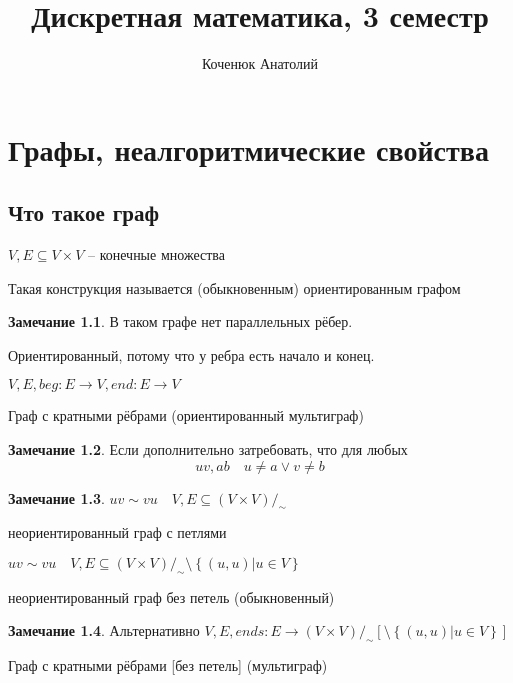 \documentclass{book}
\author{Коченюк Анатолий}
\title{Дискретная математика, 3 семестр}
\theoremstyle{definition}
\newtheorem*{note}{Замечание}
\begin{document}
    \maketitle
    \chapter{Графы, неалгоритмические свойства}
    \section{Что такое граф}

    $V, E\subseteq V\times V$ -- конечные множества

    Такая конструкция называется (обыкновенным) ориентированным графом

    \begin{note}
        В таком графе нет параллельных рёбер. 

    Ориентированный, потому что у ребра есть начало и конец.    \end{note}

    \begin{definition}
        $V, E, beg:E\to V, end:E\to V$

        Граф с кратными рёбрами (ориентированный мультиграф)
    \end{definition}

    \begin{note}
        Если дополнительно затребовать, что для любых \[uv, ab\quad u\neq a \vee v\neq b\]
    \end{note}

    \begin{note}
        $uv\sim vu\quad V, E\subseteq \left( V\times V \right) /_{\sim}$

        неориентированный граф с петлями

        $uv\sim vu\quad V, E\subseteq \left( V\times V \right) /_{\sim} \setminus \left\{ (u,u)|u\in V \right\} $

        неориентированный граф без петель (обыкновенный)
    \end{note}

    \begin{note}
        Альтернативно $V, E, ends:E \to \left( V\times V \right) /_{\sim} \left[ \setminus \left\{ (u,u)|u\in     V \right\}\right]$

        Граф с кратными рёбрами [без петель] (мультиграф)
    \end{note}
\end{document}
